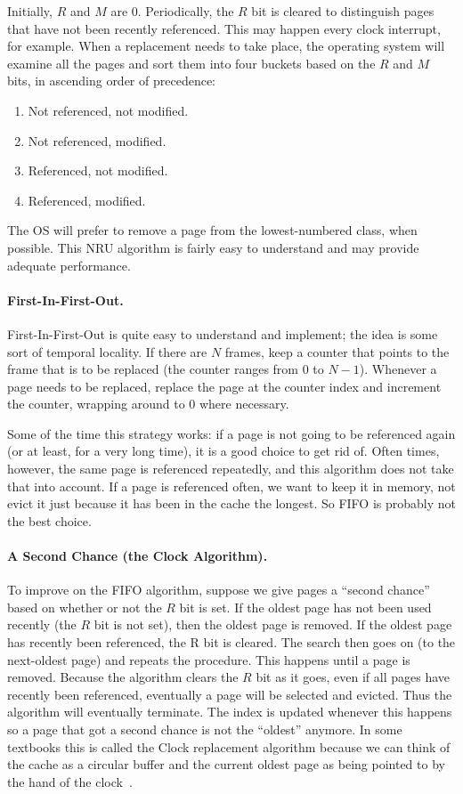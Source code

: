 Initially, $R$ and $M$ are 0. Periodically, the $R$ bit is cleared to distinguish pages that have not been recently referenced. This may happen every clock interrupt, for example. When a replacement needs to take place, the operating system will examine all the pages and sort them into four buckets based on the $R$ and $M$ bits, in ascending order of precedence:

\begin{enumerate}
	\item Not referenced, not modified.
	\item Not referenced, modified.
	\item Referenced, not modified.
	\item Referenced, modified.
\end{enumerate}

The OS will prefer to remove a page from the lowest-numbered class, when possible. This NRU algorithm is fairly easy to understand and may provide adequate performance.

\paragraph{First-In-First-Out.}
First-In-First-Out is quite easy to understand and implement; the idea is some sort of temporal locality. If there are $N$ frames, keep a counter that points to the frame that is to be replaced (the counter ranges from $0$ to $N-1$). Whenever a page needs to be replaced, replace the page at the counter index and increment the counter, wrapping around to 0 where necessary.

Some of the time this strategy works: if a page is not going to be referenced again (or at least, for a very long time), it is a good choice to get rid of. Often times, however, the same page is referenced repeatedly, and this algorithm does not take that into account. If a page is referenced often, we want to keep it in memory, not evict it just because it has been in the cache the longest. So FIFO is probably not the best choice.

\paragraph{A Second Chance (the Clock Algorithm).} 
To improve on the FIFO algorithm, suppose we give pages a ``second chance'' based on whether or not the $R$ bit is set. If the oldest page has not been used recently (the $R$ bit is not set), then the oldest page is removed. If the oldest page has recently been referenced, the R bit is cleared. The search then goes on (to the next-oldest page) and repeats the procedure. This happens until a page is removed. Because the algorithm clears the $R$ bit as it goes, even if all pages have recently been referenced, eventually a  page will be selected and evicted. Thus the algorithm will eventually terminate. The index is updated whenever this happens so a page that got a second chance is not the ``oldest'' anymore. In some textbooks this is called the Clock replacement algorithm because we can think of the cache as a circular buffer and the current oldest page as being pointed to by the hand of the clock~\cite{mos}. 

